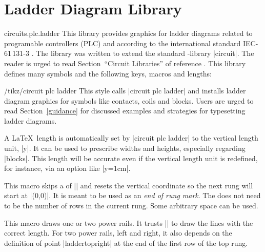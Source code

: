\documentclass[a4paper]{ltxdoc}
\begin{document}
\section{Ladder Diagram Library}

\begin{pgflibrary}{circuits.plc.ladder}
This library provides graphics for ladder diagrams related to programable controllers (PLC) and according to the international standard IEC-61\,131-3 \cite{61131}. The library was written to extend the standard \tikzname-library |circuit|. The reader is urged to read Section~``Circuit Libraries'' of reference \cite{Tantau}.
This library defines many symbols and the following keys, macros and lengths:

\begin{key}{/tikz/circuit plc ladder}
This style calls |circuit plc ladder| and installs ladder diagram graphics for symbols like contacts, coils and blocks. Users are urged to read Section~\ref{guidance} for discussed examples and strategies for typesetting ladder diagrams.
\end{key}

\begin{command}{{\ladderskip}}
A \LaTeX\ length is automatically set by |circuit plc ladder| to the vertical length unit, |y|. It can be used to prescribe widths and heights, especially regarding |blocks|. This length will be accurate even if the vertical length unit is redefined, for instance, via an option like |y=1cm|.
\end{command}

\begin{command}{{\ladderrungend}}
This macro skips a  of |\ladderskip| and resets the vertical coordinate so the next rung will start at |(0,0)|. It is meant to be used as an \emph{end of rung mark}. The  does not need to be the number of rows in the current rung. Some arbitrary space can be used.
\end{command}

\begin{command}{{\ladderpowerrails}}
This macro draws one or two power rails. It trusts |\ladderrungend| to draw the lines with the correct length. For two power rails, left and right, it also depends on the definition of point |laddertopright| at the end of the first row of the top rung.
\end{command}


\end{pgflibrary}
\end{document}
